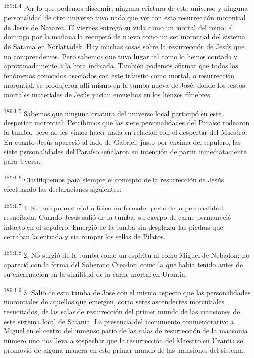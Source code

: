 \par 
\textsuperscript{189:1.4} Por lo que podemos discernir, ninguna criatura de este universo y ninguna personalidad de otro universo tuvo nada que ver con esta resurrección morontial de Jesús de Nazaret. El viernes entregó su vida como un mortal del reino; el domingo por la mañana la recuperó de nuevo como un ser morontial del sistema de Satania en Norlatiadek. Hay muchas cosas sobre la resurrección de Jesús que no comprendemos. Pero sabemos que tuvo lugar tal como lo hemos contado y aproximadamente a la hora indicada. También podemos afirmar que todos los fenómenos conocidos asociados con este tránsito como mortal, o resurrección morontial, se produjeron allí mismo en la tumba nueva de José, donde los restos mortales materiales de Jesús yacían envueltos en los lienzos fúnebres.

\par 
\textsuperscript{189:1.5} Sabemos que ninguna criatura del universo local participó en este despertar morontial. Percibimos que las siete personalidades del Paraíso rodearon la tumba, pero no les vimos hacer nada en relación con el despertar del Maestro. En cuanto Jesús apareció al lado de Gabriel, justo por encima del sepulcro, las siete personalidades del Paraíso señalaron su intención de partir inmediatamente para Uversa.

\par 
\textsuperscript{189:1.6} Clarifiquemos para siempre el concepto de la resurrección de Jesús efectuando las declaraciones siguientes:

\par 
\textsuperscript{189:1.7} 1. Su cuerpo material o físico no formaba parte de la personalidad resucitada. Cuando Jesús salió de la tumba, su cuerpo de carne permaneció intacto en el sepulcro. Emergió de la tumba sin desplazar las piedras que cerraban la entrada y sin romper los sellos de Pilatos.

\par 
\textsuperscript{189:1.8} 2. No surgió de la tumba como un espíritu ni como Miguel de Nebadon; no apareció con la forma del Soberano Creador, como la que había tenido antes de su encarnación en la similitud de la carne mortal en Urantia.

\par 
\textsuperscript{189:1.9} 3. Salió de esta tumba de José con el mismo aspecto que las personalidades morontiales de aquellos que emergen, como seres ascendentes morontiales resucitados, de las salas de resurrección del primer mundo de las mansiones de este sistema local de Satania. La presencia del monumento conmemorativo a Miguel en el centro del inmenso patio de las salas de resurrección de la mansonia número uno nos lleva a sospechar que la resurrección del Maestro en Urantia se promovió de alguna manera en este primer mundo de las mansiones del sistema.

